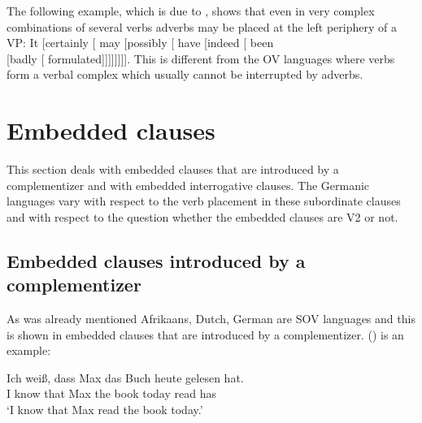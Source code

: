 The following example, which is due to \citet[§ 8.20, 495]{QGLS85a-u}, shows that even in very
complex combinations of several verbs adverbs may be placed at the left periphery of a VP:
\ea
It [certainly [ may [possibly [ have [indeed [ been\\ {}[badly [ formulated]]]]]]]].
\z
This is different from the OV languages where verbs form a verbal complex which usually cannot be
interrupted by adverbs.
\eal
{}
\zl

\section{Embedded clauses}
\label{sec-embeeded-clauses}

This section deals with embedded clauses that are introduced by a complementizer and with
embedded interrogative clauses. The Germanic languages vary with respect to the verb placement in
these subordinate clauses and with respect to the question whether the embedded clauses are V2 or not.

\subsection{Embedded clauses introduced by a complementizer}

As was already mentioned Afrikaans, Dutch, German are SOV languages and this is shown in embedded
clauses that are introduced by a complementizer. () is an example:

\ea
\gll Ich weiß, dass Max das Buch heute gelesen hat.\\
     I know that Max the book today read has\\
\glt `I know that Max read the book today.'
\z


